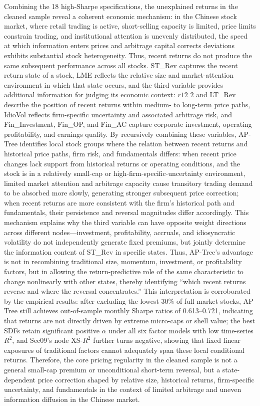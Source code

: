 \documentclass[12pt]{article}
\begin{document}
Combining the 18 high-Sharpe specifications, the unexplained returns in the cleaned sample reveal a coherent economic mechanism: in the Chinese stock market, where retail trading is active, short-selling capacity is limited, price limits constrain trading, and institutional attention is unevenly distributed, the speed at which information enters prices and arbitrage capital corrects deviations exhibits substantial stock heterogeneity. Thus, recent returns do not produce the same subsequent performance across all stocks. ST\_Rev captures the recent return state of a stock, LME reflects the relative size and market-attention environment in which that state occurs, and the third variable provides additional information for judging its economic context: \(r12\_2\) and LT\_Rev describe the position of recent returns within medium- to long-term price paths, IdioVol reflects firm-specific uncertainty and associated arbitrage risk, and Fin\_Investment, Fin\_OP, and Fin\_AC capture corporate investment, operating profitability, and earnings quality. By recursively combining these variables, AP-Tree identifies local stock groups where the relation between recent returns and historical price paths, firm risk, and fundamentals differs: when recent price changes lack support from historical returns or operating conditions, and the stock is in a relatively small-cap or high-firm-specific-uncertainty environment, limited market attention and arbitrage capacity cause transitory trading demand to be absorbed more slowly, generating stronger subsequent price correction; when recent returns are more consistent with the firm's historical path and fundamentals, their persistence and reversal magnitudes differ accordingly. This mechanism explains why the third variable can have opposite weight directions across different nodes—investment, profitability, accruals, and idiosyncratic volatility do not independently generate fixed premiums, but jointly determine the information content of ST\_Rev in specific states. Thus, AP-Tree's advantage is not in recombining traditional size, momentum, investment, or profitability factors, but in allowing the return-predictive role of the same characteristic to change nonlinearly with other states, thereby identifying ``which recent returns reverse and where the reversal concentrates.'' This interpretation is corroborated by the empirical results: after excluding the lowest \(30\%\) of full-market stocks, AP-Tree still achieves out-of-sample monthly Sharpe ratios of 0.613–0.721, indicating that returns are not directly driven by extreme micro-caps or shell value; the best SDFs retain significant positive \(\alpha\) under all six factor models with low time-series \(R^2\), and Sec09's node XS-\(R^2\) further turns negative, showing that fixed linear exposures of traditional factors cannot adequately span these local conditional returns. Therefore, the core pricing regularity in the cleaned sample is not a general small-cap premium or unconditional short-term reversal, but a state-dependent price correction shaped by relative size, historical returns, firm-specific uncertainty, and fundamentals in the context of limited arbitrage and uneven information diffusion in the Chinese market.
\end{document}

